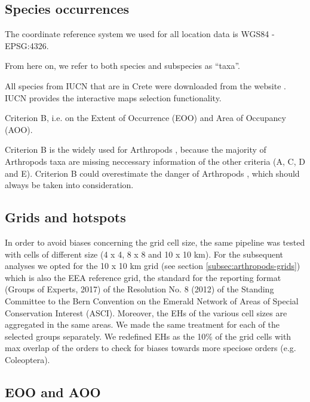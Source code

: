     \subsection{Species occurrences}
    \label{subsec:arthropods-data-assemblage}

The coordinate reference system we used for all location data is WGS84 - EPSG:4326.

From here on, we refer to both species
and subspecies as “taxa”.
    
All species 
from IUCN that are in Crete were downloaded from the website \parencite{iucn2024}. IUCN provides the 
interactive maps selection functionality. 

Criterion B, i.e. on the Extent of Occurrence (EOO) and
Area of Occupancy (AOO).

Criterion B is the widely used for Arthropods \parencite{cardoso2011adapting,carpaneto2015a-red-list},
because the majority of Arthropods taxa are missing neccessary information of the other criteria (A, C, D and E).
Criterion B could overestimate the danger of Arthropods \parencite{cardoso2011adapting},
which should always be taken into consideration.

    
    \subsection{Grids and hotspots}
    \label{subsec:arthropods-ehs-kbas}

In order to avoid biases concerning the grid cell size, the same
pipeline was tested with cells of different size (4 x 4, 8 x 8 and 10 x 10 km).
For the subsequent analyses we opted for the 10 x 10 km grid (see section \ref{subsec:arthropods-grids})
which is also the EEA reference grid, the standard for the reporting format
(Groups of Experts, 2017) of the Resolution No. 8 (2012) of the Standing Committee
to the Bern Convention on the Emerald Network of Areas of Special Conservation Interest (ASCI).
Moreover, the EHs of the various cell sizes are aggregated in the same areas.
We made the same treatment for each of the selected groups separately.
We redefined EHs as the 10\% of the grid cells with max overlap of the orders
to check for biases towards more speciose orders (e.g. Coleoptera).

    \subsection{EOO and AOO}
    \label{subsec:arthropods-eoo-aoo}



